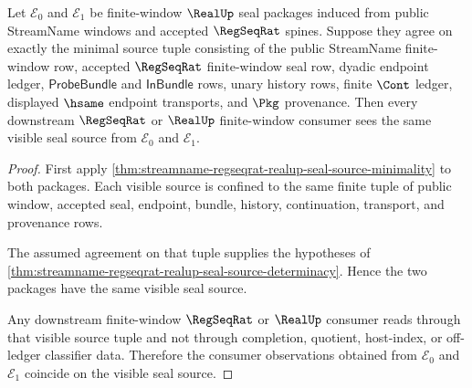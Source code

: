 \begin{theorem}
\label{thm:streamname-regseqrat-realup-seal-source-unique-source}
Let $\mathcal{E}_0$ and $\mathcal{E}_1$ be finite-window $\RealUp$ seal
packages induced from public StreamName windows and accepted $\RegSeqRat$
spines. Suppose they agree on exactly the minimal source tuple consisting of
the public StreamName finite-window row, accepted $\RegSeqRat$ finite-window
seal row, dyadic endpoint ledger, $\mathsf{ProbeBundle}$ and
$\mathsf{InBundle}$ rows, unary history rows, finite $\Cont$ ledger, displayed
$\hsame$ endpoint transports, and $\Pkg$ provenance. Then every downstream
$\RegSeqRat$ or $\RealUp$ finite-window consumer sees the same visible seal
source from $\mathcal{E}_0$ and $\mathcal{E}_1$.
\end{theorem}
\begin{proof}
First apply
\autoref{thm:streamname-regseqrat-realup-seal-source-minimality} to both
packages. Each visible source is confined to the same finite tuple of public
window, accepted seal, endpoint, bundle, history, continuation, transport, and
provenance rows.

The assumed agreement on that tuple supplies the hypotheses of
\autoref{thm:streamname-regseqrat-realup-seal-source-determinacy}. Hence the
two packages have the same visible seal source.

Any downstream finite-window $\RegSeqRat$ or $\RealUp$ consumer reads through
that visible source tuple and not through completion, quotient, host-index, or
off-ledger classifier data. Therefore the consumer observations obtained from
$\mathcal{E}_0$ and $\mathcal{E}_1$ coincide on the visible seal source.
\end{proof}
